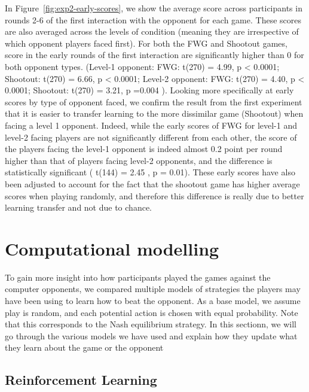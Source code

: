 \documentclass[man,floatsintext]{apa6}
\begin{document}
In Figure~\ref{fig:exp2-early-scores}, we show the average score across participants in rounds 2-6 of the first interaction with the opponent for each game. These scores are also averaged across the levels of condition (meaning they are irrespective of which opponent players faced first). For both the FWG and Shootout games, score in the early rounds of the first interaction are significantly higher than 0 for both opponent types. (Level-1 opponent: FWG: t(270) = 4.99, p \textless{} 0.0001; Shootout: t(270) = 6.66, p \textless{} 0.0001; Level-2 opponent: FWG: t(270) = 4.40, p \textless{} 0.0001; Shootout: t(270) = 3.21, p =0.004 ). Looking more specifically at early scores by type of opponent faced, we confirm the result from the first experiment that it is easier to transfer learning to the more dissimilar game (Shootout) when facing a level 1 opponent. Indeed, while the early scores of FWG for level-1 and level-2 facing players are not significantly different from each other, the score of the players facing the level-1 opponent is indeed almost 0.2 point per round higher than that of players facing level-2 opponents, and the difference is statistically significant ( t(144) = 2.45 , p = 0.01). These early scores have also been adjusted to account for the fact that the shootout game has higher average scores when playing randomly, and therefore this difference is really due to better learning transfer and not due to chance.

\newpage

\hypertarget{computational-modelling}{%
\section{Computational modelling}\label{computational-modelling}}

To gain more insight into how participants played the games against the computer opponents, we compared multiple models of strategies the players may have been using to learn how to beat the opponent. As a base model, we assume play is random, and each potential action is chosen with equal probability. Note that this corresponds to the Nash equilibrium strategy. In this sectionn, we will go through the various models we have used and explain how they update what they learn about the game or the opponent

\hypertarget{reinforcement-learning}{%
\subsection{Reinforcement Learning}\label{reinforcement-learning}}
\end{document}
